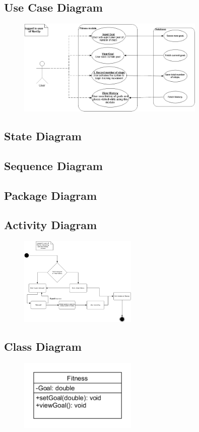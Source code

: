 \subsection{Use Case Diagram}
\begin{figure} [ht]
  \includegraphics[width=0.8\textwidth]{Fitness/FitnessUseCase.png}
\end{figure}

\subsection{State Diagram}

\subsection{Sequence Diagram}

\subsection{Package Diagram}

\subsection{Activity Diagram}
\begin{figure} 
  \includegraphics[width=0.5\textwidth]{Fitness/fitnessActivitydiagram.png}
\end{figure}

\subsection{Class Diagram}
\begin{figure} 
  \includegraphics[width=0.5\textwidth]{Fitness/FitnessClassDgm.png}
\end{figure}
